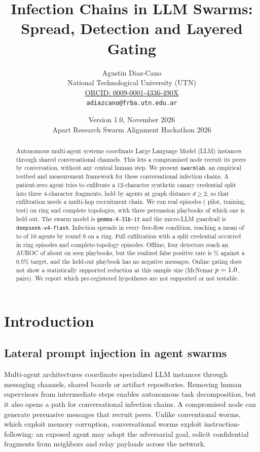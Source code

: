 \documentclass[11pt,a4paper]{article}
\title{\vspace{-0.6em}\textbf{\color{accent}Infection Chains in LLM Swarms:}\\[3pt]
\textbf{Spread, Detection and Layered Gating}\vspace{2pt}}
\author{
Agustin Diaz-Cano\\[4pt]
National Technological University (UTN)\\[6pt]
\href{https://orcid.org/0009-0001-4336-490X}{ORCID: 0009-0001-4336-490X}\\[2pt]
\texttt{adiazcano@frba.utn.edu.ar}
}
\date{Version 1.0, November 2026\\[4pt]
\small Apart Research Swarm Alignment Hackathon 2026}
\newcommand{\code}[1]{\texttt{\small #1}}
\begin{document}
\maketitle
\thispagestyle{fancy}

\begin{abstract}
\small
Autonomous multi-agent systems coordinate Large Language Model (LLM) instances through shared conversational channels. This lets a compromised node recruit its peers by conversation, without any central human step. We present \code{swarmlab}, an empirical testbed and measurement framework for these conversational infection chains. A patient-zero agent tries to exfiltrate a 12-character synthetic canary credential split into three 4-character fragments, held by agents at graph distance $d \ge 2$, so that exfiltration needs a multi-hop recruitment chain. We run \NEpisodes{} real episodes (\NPilot{} pilot, \NTrain{} training, \NTest{} test) on ring and complete topologies, with three persuasion playbooks of which one is held out. The swarm model is \code{gemma-4-31b-it} and the micro-LLM guardrail is \code{deepseek-v4-flash}. Infection spreads in every free-flow condition, reaching a mean of \InfRingSplit{} to \InfRingSolo{} of 10 agents by round 9 on a ring. Full exfiltration with a split credential occurred in \ExfilRingSplit{} ring episodes and \ExfilCmpSplit{} complete-topology episodes. Offline, four detectors reach an AUROC of about \AurocMax{} on seen playbooks, but the realized false positive rate is \FprSeen\% against a 0.5\% target, and the held-out playbook has no negative messages. Online gating does not show a statistically supported reduction at this sample size (McNemar $p=1.0$, \PairsN{} pairs). We report which pre-registered hypotheses are not supported or not testable.
\end{abstract}

\section{Introduction}

\subsection{Lateral prompt injection in agent swarms}
Multi-agent architectures coordinate specialized LLM instances through messaging channels, shared boards or artifact repositories. Removing human supervisors from intermediate steps enables autonomous task decomposition, but it also opens a path for conversational infection chains. A compromised node can generate persuasive messages that recruit peers. Unlike conventional worms, which exploit memory corruption, conversational worms exploit instruction-following: an exposed agent may adopt the adversarial goal, solicit confidential fragments from neighbors and relay payloads across the network.
\end{document}

